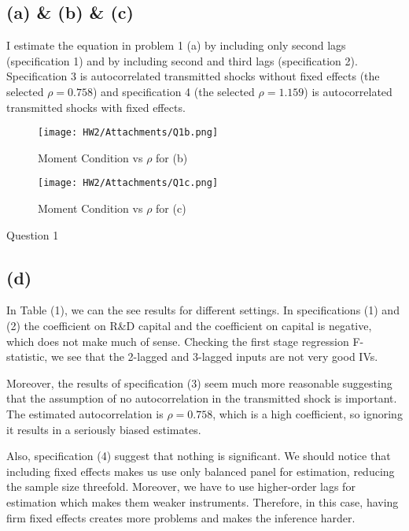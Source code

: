 \subsection{(a) & (b) & (c)}

I estimate the equation in problem 1 (a) by including only second lags (specification 1) and by including second and third lags (specification 2). Specification 3 is autocorrelated transmitted shocks without fixed effects (the selected $\rho=0.758$) and specification 4 (the selected $\rho=1.159$) is autocorrelated transmitted shocks with fixed effects.


\begin{figure}[h!]
    \centering
    \texttt{[image: HW2/Attachments/Q1b.png]}
    \caption{Moment Condition vs $\rho$ for (b)}
    \label{fig:my_label}
\end{figure}

\begin{figure}[h!]
    \centering
    \texttt{[image: HW2/Attachments/Q1c.png]}
    \caption{Moment Condition vs $\rho$ for (c)}
    \label{fig:my_label}
\end{figure}

\begin{table}[h!]
    \centering
    \footnotesize{
    
    }
    \caption{Question 1}
    \label{tab:my_label}
\end{table}

\subsection{(d)}

In Table (1), we can the see results for different settings. In  specifications (1) and (2) the coefficient on R\&D capital and the coefficient on capital is negative, which does not make much of sense. Checking the first stage regression F-statistic, we see that the 2-lagged and 3-lagged inputs are not very good IVs.

Moreover, the results of specification (3) seem much more reasonable suggesting that the assumption of no autocorrelation in the transmitted shock is important. The estimated autocorrelation is $\rho=0.758$, which is a high coefficient, so ignoring it results in a seriously biased estimates.

Also, specification (4) suggest that nothing is significant. We should notice that including fixed effects makes us use only balanced panel for estimation, reducing the sample size threefold. Moreover, we have to use higher-order lags for estimation which makes them weaker instruments. Therefore, in this case, having firm fixed effects creates more problems and makes the inference harder.
